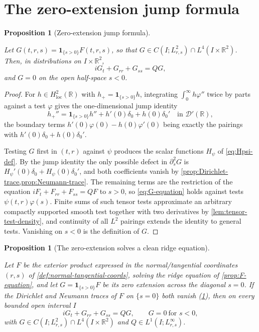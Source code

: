 \documentclass[11pt,oneside]{book}
\providecommand{\uses}[1]{}
\newtheorem{proposition}[theorem]{Proposition}
\theoremstyle{definition}
\theoremstyle{remark}
\newcommand{\R}{\mathbb R}
\newcommand{\D}{\mathcal D}
\newcommand{\1}{\mathbf 1}
\newcommand{\loc}{\mathrm{loc}}
\begin{document}
\section{The zero-extension jump formula}

\begin{proposition}[Zero-extension jump formula]\label{prop:zero-extension-jump}
\uses{prop:Dirichlet-trace, prop:Neumann-trace, def:exterior-product}
Let $G(t,r,s)=\1_{\{s>0\}}F(t,r,s)$, so that $G\in C(I;L^2_{r,s})\cap L^4(I\times\R^2)$.
Then, in distributions on $I\times\R^2$,
\begin{equation}
 iG_t+G_{rr}+G_{ss}=QG, \label{eq:G-equation}
\end{equation}
and $G=0$ on the open half-space $s<0$.
\end{proposition}

\begin{proof}
\uses{prop:Dirichlet-trace, prop:Neumann-trace, lem:tensor-test-density}
For $h\in H^2_{\loc}(\R)$ with $h_+=\1_{\{s>0\}}h$, integrating
$\int_0^\infty h\varphi''$ twice by parts against a test $\varphi$ gives the
one-dimensional jump identity
\[
 h_+''=\1_{\{s>0\}}h''+h'(0)\delta_0+h(0)\delta_0'\quad\text{in }\D'(\R),
\]
the boundary terms $h'(0)\varphi(0)-h(0)\varphi'(0)$ being exactly the pairings
with $h'(0)\delta_0+h(0)\delta_0'$.

Testing $G$ first in $(t,r)$ against $\psi$ produces the scalar functions
$H_\psi$ of \eqref{eq:Hpsi-def}. By the jump identity the only possible defect in
$\partial_s^2G$ is $H_\psi'(0)\delta_0+H_\psi(0)\delta_0'$, and both coefficients
vanish by \cref{prop:Dirichlet-trace,prop:Neumann-trace}. The remaining terms are
the restriction of the equation $iF_t+F_{rr}+F_{ss}=QF$ to $s>0$, so
\eqref{eq:G-equation} holds against tests $\psi(t,r)\varphi(s)$. Finite sums of
such tensor tests approximate an arbitrary compactly supported smooth test
together with two derivatives by \cref{lem:tensor-test-density}, and continuity
of all $L^2$ pairings extends the identity to general tests. Vanishing on $s<0$
is the definition of $G$.
\end{proof}


\begin{proposition}[The zero-extension solves a clean ridge equation]\label{prop:G-equation}
\uses{def:normal-tangential-coords, prop:F-equation, prop:zero-extension-jump, def:exterior-product}
Let $F$ be the exterior product expressed in the normal/tangential coordinates $(r,s)$ of
\cref{def:normal-tangential-coords}, solving the ridge equation of \cref{prop:F-equation}, and let
$G=\1_{\{s>0\}}F$ be its zero extension across the diagonal $s=0$. If the Dirichlet and Neumann
traces of $F$ on $\{s=0\}$ both vanish (\cref{prop:zero-extension-jump}), then on every bounded
open interval $I$
\[
 iG_t+G_{rr}+G_{ss}=QG,\qquad G=0\ \text{for }s<0,
\]
with $G\in C(I;L^2_{r,s})\cap L^4(I\times\R^2)$ and $Q\in L^1(I;L^\infty_{r,s})$.
\end{proposition}
\end{document}
